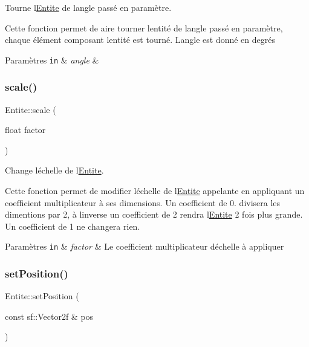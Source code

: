 Tourne l\textquotesingle{}\hyperlink{class_entite}{Entite} de l\textquotesingle{}angle passé en paramètre. 

Cette fonction permet de aire tourner l\textquotesingle{}entité de l\textquotesingle{}angle passé en paramètre, chaque élément composant l\textquotesingle{}entité est tourné. L\textquotesingle{}angle est donné en degrés 
\begin{DoxyParams}[1]{Paramètres}
\mbox{\tt in}  & {\em angle} & \\
\hline
\end{DoxyParams}
\mbox{\label{class_entite_a770f6c53856606c4de768bb942299659}} 
\subsubsection{\texorpdfstring{scale()}{scale()}}
{\footnotesize\ttfamily Entite\+::scale (\begin{DoxyParamCaption}\item[{float}]{factor }\end{DoxyParamCaption})}



Change l\textquotesingle{}échelle de l\textquotesingle{}\hyperlink{class_entite}{Entite}. 

Cette fonction permet de modifier l\textquotesingle{}échelle de l\textquotesingle{}\hyperlink{class_entite}{Entite} appelante en appliquant un coefficient multiplicateur à ses dimensions. Un coefficient de 0. divisera les dimentions par 2, à l\textquotesingle{}inverse un coefficient de 2 rendra l\textquotesingle{}\hyperlink{class_entite}{Entite} 2 fois plus grande. Un coefficient de 1 ne changera rien. 
\begin{DoxyParams}[1]{Paramètres}
\mbox{\tt in}  & {\em factor} & Le coefficient multiplicateur d\textquotesingle{}échelle à appliquer \\
\hline
\end{DoxyParams}
\mbox{\label{class_entite_aa7fe4a7ebd8eb4c80ef9fdb7d97f2dad}} 
\subsubsection{\texorpdfstring{set\+Position()}{setPosition()}}
{\footnotesize\ttfamily Entite\+::set\+Position (\begin{DoxyParamCaption}\item[{const sf\+::\+Vector2f \&}]{pos }\end{DoxyParamCaption})}




